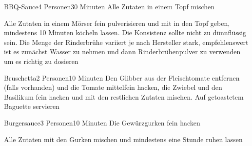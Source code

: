 

\begin{recipe}{BBQ-Sauce}{4 Personen}{30 Minuten}
Alle Zutaten in einem Topf mischen

Alle Zutaten in einem Mörser fein pulverisieren und mit in den Topf geben, mindestens 10 Minuten köcheln lassen. Die Konsistenz sollte nicht zu dünnflüssig sein. Die Menge der Rinderbrühe variiert je nach Hersteller stark, empfehlenswert ist es zunächst Wasser zu nehmen und dann Rinderbrühenpulver zu verwenden um es richtig zu dosieren
\end{recipe}


\begin{recipe}{Bruschetta}{2 Personen}{10 Minuten}
Den Glibber aus der Fleischtomate entfernen (falls vorhanden) und die Tomate mittelfein hacken, die Zwiebel und den Basilikum fein hacken und mit den restlichen Zutaten mischen. Auf getoastetem Baguette servieren

\end{recipe} 


\begin{recipe}{Burgersauce}{3 Personen}{10 Minuten}
Die Gewürzgurken fein hacken

Alle Zutaten mit den Gurken mischen und mindestens eine Stunde ruhen lassen
\end{recipe}

